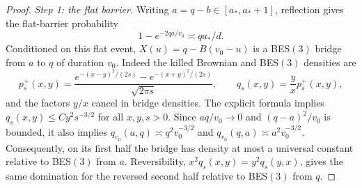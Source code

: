\documentclass[11pt,letterpaper,reqno]{amsart}
\newif\ifrevmarks \revmarkstrue
\newcommand{\add}[1]{\ifrevmarks\textcolor{revorange}{#1}\else#1\fi}
\numberwithin{equation}{section}
\theoremstyle{remark}
\begin{document}
\begin{proof}
\add{\emph{Step 1: the flat barrier.}} Writing $a=q-b\in[a_*,a_*+1]$, reflection gives the flat-barrier probability
\begin{equation}\label{eq:7.14}
1-e^{-2qa/v_0}\asymp qa_*/d.
\end{equation}
Conditioned on this flat event, $X(u)=q-B(v_0-u)$ is a BES$(3)$ bridge from $a$ to $q$ of duration $v_0$. Indeed the killed Brownian and BES$(3)$ densities are
\begin{equation}\label{eq:7.15}
p_s^+(x,y)=\frac{e^{-(x-y)^2/(2s)}-e^{-(x+y)^2/(2s)}}{\sqrt{2\pi s}},
\qquad q_s(x,y)=\frac yx p_s^+(x,y),
\end{equation}
and the factors $y/x$ cancel in bridge densities.
The explicit formula implies $q_s(x,y)\le Cy^2s^{-3/2}$ for all $x,y,s>0$.
Since $aq/v_0\to0$ and $(q-a)^2/v_0$ is bounded, it also implies
$q_{v_0}(a,q)\asymp q^2v_0^{-3/2}$ and
$q_{v_0}(q,a)\asymp a^2v_0^{-3/2}$.
Consequently, on its first half the bridge has density at most a universal constant relative to BES$(3)$ from $a$. Reversibility,
$x^2q_s(x,y)=y^2q_s(y,x)$, gives the same domination for the reversed second half relative to BES$(3)$ from $q$.


\end{proof}
\end{document}

